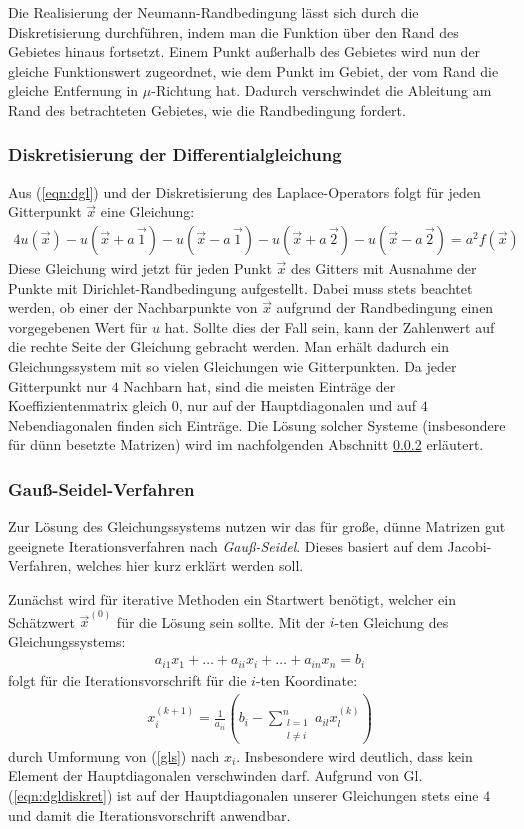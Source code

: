 \documentclass[10pt,a4paper]{article}
\begin{document}
Die Realisierung der Neumann-Randbedingung lässt sich durch die Diskretisierung durchführen, indem man die Funktion über den Rand des Gebietes hinaus fortsetzt. Einem Punkt außerhalb des Gebietes wird nun der gleiche Funktionswert zugeordnet, wie dem Punkt im 
Gebiet, der vom Rand die gleiche Entfernung in $\mu$-Richtung hat. Dadurch verschwindet die Ableitung am Rand des betrachteten Gebietes, wie die Randbedingung fordert.


\subsubsection{Diskretisierung der Differentialgleichung}
Aus (\ref{eqn:dgl}) und der Diskretisierung des Laplace-Operators folgt für jeden Gitterpunkt $\vec{x}$ eine Gleichung:
\begin{align}
4 u(\vec{x}) - u(\vec{x}+a\,\vec{1}) - u(\vec{x}-a\,\vec{1}) - u(\vec{x}+a\,\vec{2}) - u(\vec{x}-a\,\vec{2}) = a^2 f(\vec{x})
\label{eqn:dgldiskret}
\end{align}
Diese Gleichung wird jetzt für jeden Punkt $\vec{x}$ des Gitters mit Ausnahme der Punkte mit Dirichlet-Randbedingung aufgestellt. Dabei muss stets beachtet werden, ob einer der Nachbarpunkte von $\vec{x}$ aufgrund der Randbedingung einen vorgegebenen Wert für $u$ hat. Sollte dies der Fall sein, kann der Zahlenwert auf die rechte Seite der Gleichung gebracht werden.
Man erhält dadurch ein Gleichungssystem mit so vielen Gleichungen wie Gitterpunkten. Da jeder Gitterpunkt nur $4$ Nachbarn hat, sind die meisten Einträge der Koeffizientenmatrix gleich $0$, nur auf der Hauptdiagonalen und auf $4$ Nebendiagonalen finden sich Einträge. Die Lösung solcher Systeme (insbesondere für dünn besetzte Matrizen) wird im nachfolgenden Abschnitt \ref{sec:gauss-seidel} erläutert.

\subsubsection{Gauß-Seidel-Verfahren}
\label{sec:gauss-seidel}
Zur Lösung des Gleichungssystems nutzen wir das für große, dünne Matrizen gut geeignete Iterationsverfahren nach \emph{Gauß-Seidel}. Dieses basiert auf dem Jacobi-Verfahren, welches hier kurz erklärt werden soll.

Zunächst wird für iterative Methoden ein Startwert benötigt, welcher ein Schätzwert $\vec{x}^{(0)}$ für die Lösung sein sollte. Mit der $i$-ten Gleichung des Gleichungssystems:
\begin{align}
\label{gls}
a_{i1} x_{1} + \dots + a_{ii} x_{i} + \dots + a_{in} x_{n} = b_i
\end{align}
folgt für die Iterationsvorschrift für die $i$-ten Koordinate:
\begin{align}
\label{iterationsvorschrift}
x_i^{(k+1)} = \frac{1}{a_{ii}}\left( b_i - \sum^{n}_{\substack{l=1 \\ l \neq i}} a_{il} x_l^{(k)} \right) 
\end{align}
durch Umformung von (\ref{gls}) nach $x_i$. Insbesondere wird deutlich, dass kein Element der Hauptdiagonalen verschwinden darf. Aufgrund von Gl. (\ref{eqn:dgldiskret}) ist auf der Hauptdiagonalen unserer Gleichungen stets eine $\num{4}$ und damit die Iterationsvorschrift anwendbar.
\end{document}
